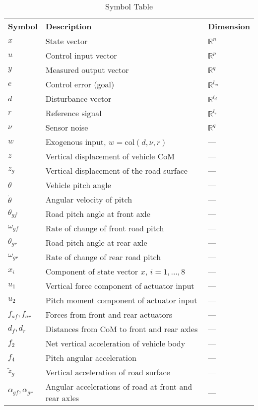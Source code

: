 \documentclass[]{report}
\begin{document}
\begin{table}[H]
	\centering
	\caption{Symbol Table}
	\begin{tabular}{lll}
		\toprule
		\textbf{Symbol} & \textbf{Description} & \textbf{Dimension} \\
		\midrule
		$x$ & State vector & $\mathbb{R}^n$ \\
		$u$ & Control input vector & $\mathbb{R}^p$ \\
		$y$ & Measured output vector & $\mathbb{R}^q$ \\
		$e$ & Control error (goal) & $\mathbb{R}^{l_m}$ \\
		$d$ & Disturbance vector & $\mathbb{R}^{l_d}$ \\
		$r$ & Reference signal & $\mathbb{R}^{l_r}$ \\
		$\nu$ & Sensor noise & $\mathbb{R}^q$ \\
		$w$ & Exogenous input, $w = \text{col}(d, \nu, r)$ & --- \\
		$z$ & Vertical displacement of vehicle CoM & --- \\
		$z_g$ & Vertical displacement of the road surface & --- \\
		$\theta$ & Vehicle pitch angle & --- \\
		$\dot{\theta}$ & Angular velocity of pitch & --- \\
		$\theta_{gf}$ & Road pitch angle at front axle & --- \\
		$\omega_{gf}$ & Rate of change of front road pitch & --- \\
		$\theta_{gr}$ & Road pitch angle at rear axle & --- \\
		$\omega_{gr}$ & Rate of change of rear road pitch & --- \\
		$x_i$ & Component of state vector $x$, $i = 1,\dots,8$ & --- \\
		$u_1$ & Vertical force component of actuator input & --- \\
		$u_2$ & Pitch moment component of actuator input & --- \\
		$f_{af}, f_{ar}$ & Forces from front and rear actuators & --- \\
		$d_f, d_r$ & Distances from CoM to front and rear axles & --- \\
		$f_2$ & Net vertical acceleration of vehicle body & --- \\
		$f_4$ & Pitch angular acceleration & --- \\
		$\ddot{z}_g$ & Vertical acceleration of road surface & --- \\
		$\alpha_{gf}, \alpha_{gr}$ & Angular accelerations of road at front and rear axles & --- \\

\end{tabular}
\end{table}
\end{document}
